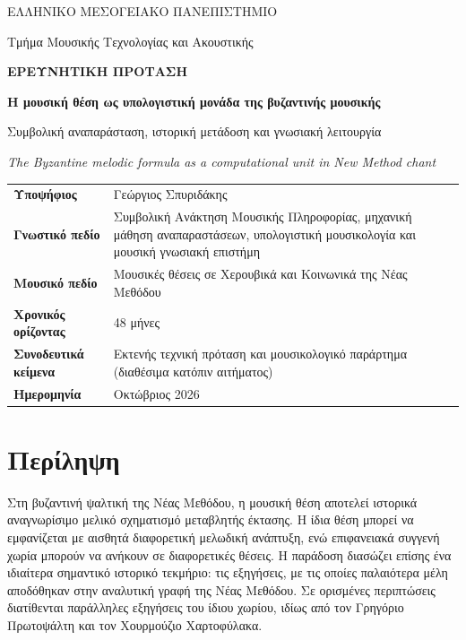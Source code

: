 \documentclass[11pt,a4paper]{article}
\begin{document}
\fontsize{10.32}{11.91}\selectfont
\raggedright
\setlength{\parindent}{1em}

\begin{titlepage}
\centering
\vspace*{0.7cm}
{\sffamily\large ΕΛΛΗΝΙΚΟ ΜΕΣΟΓΕΙΑΚΟ ΠΑΝΕΠΙΣΤΗΜΙΟ\par}
{\sffamily Τμήμα Μουσικής Τεχνολογίας και Ακουστικής\par}
\vspace{1.6cm}
{\Large\bfseries\color{acc} ΕΡΕΥΝΗΤΙΚΗ ΠΡΟΤΑΣΗ\par}
\vspace{1.2cm}
{\fontsize{22}{27}\selectfont\bfseries Η μουσική θέση ως υπολογιστική μονάδα της βυζαντινής μουσικής\par}
\vspace{0.6cm}
{\Large Συμβολική αναπαράσταση, ιστορική μετάδοση και γνωσιακή λειτουργία\par}
\vspace{0.5cm}
{\large\itshape The Byzantine melodic formula as a computational unit in New Method chant\par}
\vspace{1.1cm}

\vfill
\begin{tabularx}{0.94\linewidth}{@{}>{\bfseries}L{3.9cm}Y@{}}
Υποψήφιος & Γεώργιος Σπυριδάκης\\[8pt]
Γνωστικό πεδίο & Συμβολική Ανάκτηση Μουσικής Πληροφορίας, μηχανική μάθηση αναπαραστάσεων, υπολογιστική μουσικολογία και μουσική γνωσιακή επιστήμη\\[8pt]
Μουσικό πεδίο & Μουσικές θέσεις σε Χερουβικά και Κοινωνικά της Νέας Μεθόδου\\[8pt]
Χρονικός ορίζοντας & 48 μήνες\\[8pt]
Συνοδευτικά κείμενα & Εκτενής τεχνική πρόταση και μουσικολογικό παράρτημα (διαθέσιμα κατόπιν αιτήματος)\\[8pt]
Ημερομηνία & Οκτώβριος 2026
\end{tabularx}
\vspace{0.3cm}
\end{titlepage}
\setcounter{page}{1}

\section*{Περίληψη}
Στη βυζαντινή ψαλτική της Νέας Μεθόδου, η μουσική θέση αποτελεί ιστορικά αναγνωρίσιμο μελικό σχηματισμό μεταβλητής έκτασης. Η ίδια θέση μπορεί να εμφανίζεται με αισθητά διαφορετική μελωδική ανάπτυξη, ενώ επιφανειακά συγγενή χωρία μπορούν να ανήκουν σε διαφορετικές θέσεις. Η παράδοση διασώζει επίσης ένα ιδιαίτερα σημαντικό ιστορικό τεκμήριο: τις εξηγήσεις, με τις οποίες παλαιότερα μέλη αποδόθηκαν στην αναλυτική γραφή της Νέας Μεθόδου. Σε ορισμένες περιπτώσεις διατίθενται παράλληλες εξηγήσεις του ίδιου χωρίου, ιδίως από τον Γρηγόριο Πρωτοψάλτη και τον Χουρμούζιο Χαρτοφύλακα.
\end{document}

